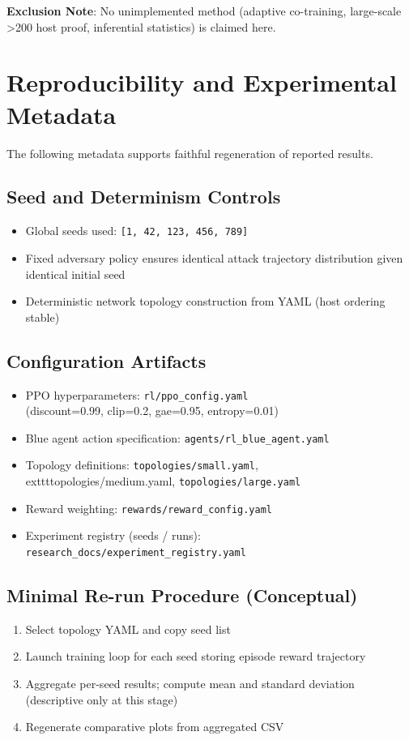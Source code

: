 \documentclass[12pt,oneside,a4paper]{article}
\theoremstyle{definition}
\theoremstyle{plain}
\begin{document}
	\textbf{Exclusion Note}: No unimplemented method (adaptive co-training, large-scale >200 host proof, inferential statistics) is claimed here.

\section{Reproducibility and Experimental Metadata}

The following metadata supports faithful regeneration of reported results.

\subsection{Seed and Determinism Controls}
\begin{itemize}
    \item Global seeds used: \texttt{[1, 42, 123, 456, 789]}
    \item Fixed adversary policy ensures identical attack trajectory distribution given identical initial seed
    \item Deterministic network topology construction from YAML (host ordering stable)
\end{itemize}

\subsection{Configuration Artifacts}
\begin{itemize}
    \item PPO hyperparameters: \texttt{rl/ppo\_config.yaml} \\
          (discount=0.99, clip=0.2, gae=0.95, entropy=0.01)
    \item Blue agent action specification: \texttt{agents/rl\_blue\_agent.yaml}
    \item Topology definitions: \texttt{topologies/small.yaml}, \\
          	exttt{topologies/medium.yaml}, \texttt{topologies/large.yaml}
    \item Reward weighting: \texttt{rewards/reward\_config.yaml}
    \item Experiment registry (seeds / runs): \texttt{research\_docs/experiment\_registry.yaml}
\end{itemize}

\subsection{Minimal Re-run Procedure (Conceptual)}
\begin{enumerate}
    \item Select topology YAML and copy seed list
    \item Launch training loop for each seed storing episode reward trajectory
    \item Aggregate per-seed results; compute mean and standard deviation (descriptive only at this stage)
    \item Regenerate comparative plots from aggregated CSV
\end{enumerate}
\end{document}
